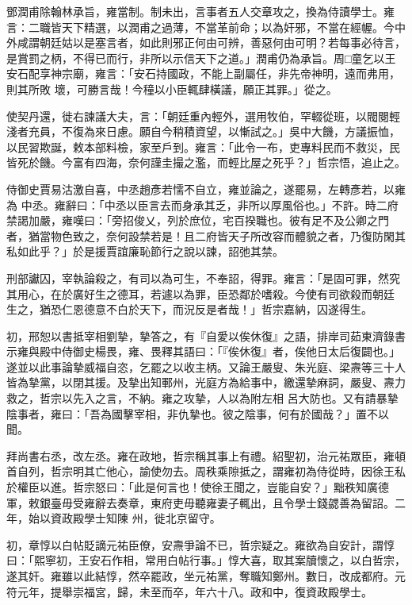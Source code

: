 \begin{pinyinscope}
 鄧潤甫除翰林承旨，雍當制。制未出，言事者五人交章攻之，換為侍讀學士。雍言：二職皆天下精選，以潤甫之過薄，不當革前命；以為奸邪，不當在經幄。今中外咸謂朝廷姑以是塞言者，如此則邪正何由可辨，善惡何由可明？若每事必待言，是賞罰之柄，不得已而行，非所以示信天下之道。」潤甫仍為承旨。周□童乞以王安石配享神宗廟，雍言：「安石持國政，不能上副屬任，非先帝神明，遠而弗用，則其所敗
 壞，可勝言哉！今穜以小臣輒肆橫議，願正其罪。」從之。



 使契丹還，徙右諫議大夫，言：「朝廷重內輕外，選用牧伯，罕輟從班，以閥閱輕淺者充員，不復為來日慮。願自今稍積資望，以慚試之。」吳中大饑，方議振恤，以民習欺誕，敕本部料檢，家至戶到。雍言：「此令一布，吏專料民而不救災，民皆死於饑。今富有四海，奈何謹圭撮之濫，而輕比屋之死乎？」哲宗悟，追止之。



 侍御史賈易沽激自喜，中丞趙彥若懦不自立，雍並論之，遂罷易，左轉彥若，以雍為
 中丞。雍辭曰：「中丞以臣言去而身承其乏，非所以厚風俗也。」不許。時二府禁謁加嚴，雍嘆曰：「旁招俊乂，列於庶位，宅百揆職也。彼有足不及公卿之門者，猶當物色致之，奈何設禁若是！且二府皆天子所改容而體貌之者，乃復防閑其私如此乎？」於是援賈誼廉恥節行之說以諫，詔弛其禁。



 刑部讞囚，宰執論殺之，有司以為可生，不奉詔，得罪。雍言：「是固可罪，然究其用心，在於廣好生之德耳，若遽以為罪，臣恐鄰於嗜殺。今使有司欲殺而朝廷
 生之，猶恐仁恩德意不白於天下，而況反是者哉！」哲宗嘉納，囚遂得生。



 初，邢恕以書抵宰相劉摯，摯答之，有『自愛以俟休復』之語，排岸司茹東濟錄書示雍與殿中侍御史楊畏，雍、畏釋其語曰：「『俟休復』者，俟他日太后復闢也。」遂並以此事論摯威福自恣，乞罷之以收主柄。又論王嚴叟、朱光庭、梁燾等三十人皆為摯黨，以閉其援。及摯出知鄆州，光庭方為給事中，繳還摯麻詞，嚴叟、燾力救之，哲宗以先入之言，不納。雍之攻摯，人以為附左相
 呂大防也。又有請暴摯陰事者，雍曰：「吾為國擊宰相，非仇摯也。彼之陰事，何有於國哉？」置不以聞。



 拜尚書右丞，改左丞。雍在政地，哲宗稱其事上有禮。紹聖初，治元祐眾臣，雍頓首自列，哲宗明其亡他心，諭使勿去。周秩乘隙抵之，謂雍初為侍從時，因徐王私於權臣以進。哲宗怒曰：「此是何言也！使徐王聞之，豈能自安？」黜秩知廣德軍，敕銀臺毋受雍辭去奏章，東府吏毋聽雍妻子輒出，且令學士錢勰善為留詔。二年，始以資政殿學士知陳
 州，徙北京留守。



 初，章惇以白帖貶謫元祐臣僚，安燾爭論不已，哲宗疑之。雍欲為自安計，謂惇曰：「熙寧初，王安石作相，常用白帖行事。」惇大喜，取其案牘懷之，以白哲宗，遂其奸。雍雖以此結惇，然卒罷政，坐元祐黨，奪職知鄭州。數日，改成都府。元符元年，提舉崇福宮，歸，未至而卒，年六十八。政和中，復資政殿學士。




\end{pinyinscope}
